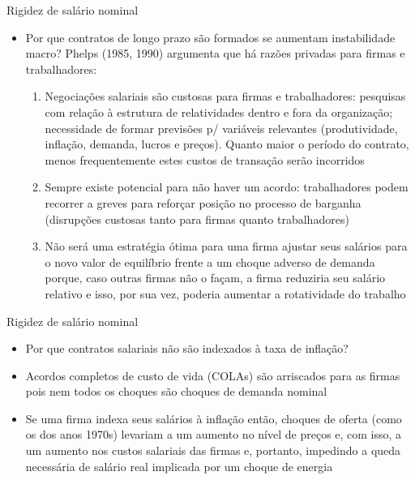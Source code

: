 \documentclass[10pt]{beamer}
\begin{document}
\begin{frame}{Rigidez de salário nominal}
    \begin{itemize}
        \item Por que contratos de longo prazo são formados se aumentam instabilidade macro? Phelps (1985, 1990) argumenta que há razões privadas para firmas e trabalhadores:\bigskip
        \begin{enumerate}
            \item Negociações salariais são custosas para firmas e trabalhadores: pesquisas com relação à estrutura de relatividades dentro e fora da organização; necessidade de formar previsões p/ variáveis relevantes (produtividade, inflação, demanda, lucros e preços). Quanto maior o período do contrato, menos frequentemente estes custos de transação serão incorridos\bigskip
            \item Sempre existe potencial para não haver um acordo: trabalhadores podem recorrer a greves para reforçar posição no processo de barganha (disrupções custosas tanto para firmas quanto trabalhadores)\bigskip
            \item Não será uma estratégia ótima para uma firma ajustar seus salários para o novo valor de equilíbrio frente a um choque adverso de demanda porque, caso outras firmas não o façam, a firma reduziria seu salário relativo e isso, por sua vez, poderia aumentar a rotatividade do trabalho
        \end{enumerate}
    \end{itemize}
\end{frame}

\begin{frame}{Rigidez de salário nominal}
    \begin{itemize}
        \item Por que contratos salariais não são indexados à taxa de inflação?\bigskip
        \item Acordos completos de custo de vida (COLAs) são arriscados para as firmas pois nem todos os choques são choques de demanda nominal\bigskip
        \item Se uma firma indexa seus salários à inflação então, choques de oferta (como os dos anos 1970s) levariam a um aumento no nível de preços e, com isso, a um aumento nos custos salariais das firmas e, portanto, impedindo a queda necessária de salário real implicada por um choque de energia
    \end{itemize}
\end{frame}
\end{document}
